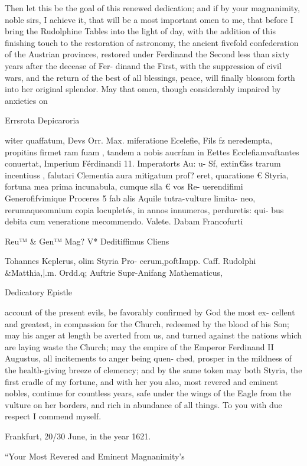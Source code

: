 \documentclass{article}
\begin{document}
{{Then let this be the goal of this renewed dedication; and if by your
magnanimity, noble sirs, I achieve it, that will be a most important omen
to me, that before I bring the Rudolphine Tables into the light of day,
with the addition of this finishing touch to the restoration of astronomy,
the ancient fivefold confederation of the Austrian provinces, restored
under Ferdinand the Second less than sixty years after the decease of Fer-
dinand the First, with the suppression of civil wars, and the return of the
best of all blessings, peace, will finally blossom forth into her original
splendor. May that omen, though considerably impaired by anxieties on

Errsrota Depicaroria

witer quaffatum, Devs Orr. Max. miferatione Ecelefie, Fils fz
neredempta, propitins firmet ram fuam , tandem a nobis aucrfam in Eettes
Ecclefiamvaftantes conuertat, Imperium Férdinandi 11. Imperatorts Au: u-
Sf, extin€iss trarum incentiuss , falutari Clementia aura mitigatum prof? eret,
quaratione € Styria, fortuna mea prima incunabula, cumque slla € vos Re-
uerendifimi Generofifvimique Proceres 5 fab alis Aquile tutra-vulture limita-
neo, rerumaqueomnium copia locupletés, in annos innumeros, perduretis: qui-
bus debita cum veneratione mecommendo. Valete. Dabam Francofurti

Reu™ & Gen™ Mag? V*
Deditiffimus Cliens

Tohannes Keplerus, olim Styria Pro-
cerum,poftImpp. Caff. Rudolphi
&Matthia,|.m. Ordd.q; Auftrie
Supr-Anifang Mathematicus,

Dedicatory Epistle

account of the present evils, be favorably confirmed by God the most ex-
cellent and greatest, in compassion for the Church, redeemed by the
blood of his Son; may his anger at length be averted from us, and turned
against the nations which are laying waste the Church; may the empire of
the Emperor Ferdinand II Augustus, all incitements to anger being quen-
ched, prosper in the mildness of the health-giving breeze of clemency;
and by the same token may both Styria, the first cradle of my fortune,
and with her you also, most revered and eminent nobles, continue for
countless years, safe under the wings of the Eagle from the vulture on her
borders, and rich in abundance of all things. To you with due respect I
commend myself.

Frankfurt, 20/30 June, in the year 1621.

“Your Most Revered and Eminent Magnanimity’s

}}
\end{document}
